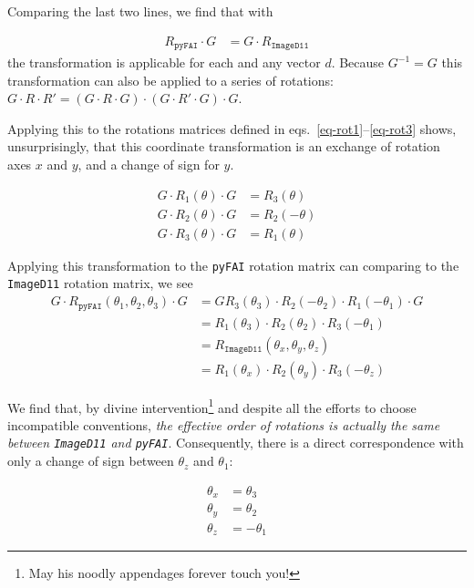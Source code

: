 \documentclass[12pt]{article}
\begin{document}
Comparing the last two lines, we find that with

\begin{align}
  R_{\mathtt{pyFAI}} \cdot G
  & =
  G \cdot R_{\mathtt{ImageD11}}
\end{align}
the transformation is applicable for each and any vector $d$.  Because
$G^{-1} = G$ this transformation can also be applied to a series of
rotations: $G \cdot R \cdot R' = (G \cdot R \cdot G) \cdot (G \cdot R'
\cdot G) \cdot G$.

Applying this to the rotations matrices defined in
eqs.~\ref{eq-rot1}--\ref{eq-rot3} shows, unsurprisingly, that this
coordinate transformation is an exchange of rotation axes $x$ and
$y$, and a change of sign for $y$.

\begin{align}
  G \cdot R_1(\theta) \cdot G & = R_3(\theta) \\
  G \cdot R_2(\theta) \cdot G & = R_2(-\theta) \\
  G \cdot R_3(\theta) \cdot G & = R_1(\theta)
\end{align}

Applying this transformation to the \texttt{pyFAI} rotation matrix can
comparing to the \texttt{ImageD11} rotation matrix, we see
\begin{align}
  G \cdot R_{\mathtt{pyFAI}}(\theta_1, \theta_2, \theta_3)
  \cdot G
  & =
  G R_3(\theta_3) \cdot R_2(-\theta_2) \cdot R_1(-\theta_1)
  \cdot G
  \\
  & =
  R_1(\theta_3) \cdot R_2(\theta_2) \cdot R_3(-\theta_1)
  \\
  & =
  R_{\mathtt{ImageD11}}(\theta_x, \theta_y, \theta_z)
  \\
  & =
  R_1(\theta_x) \cdot R_2(\theta_y) \cdot R_3(-\theta_z)
\end{align}

We find that, by divine intervention\footnote{May his noodly
  appendages forever touch you!} and despite all the efforts to choose
incompatible conventions, \emph{the effective order of rotations is
  actually the same between \texttt{ImageD11} and
  \texttt{pyFAI}}. Consequently, there is a direct correspondence with
only a change of sign between $\theta_z$ and $\theta_1$:

\begin{align}
  \theta_x & = \theta_3
  \label{eq-thetax}
  \\
  \theta_y & = \theta_2
  \label{eq-thetay}
  \\
  \theta_z & = -\theta_1
  \label{eq-thetaz}
\end{align}
\end{document}
